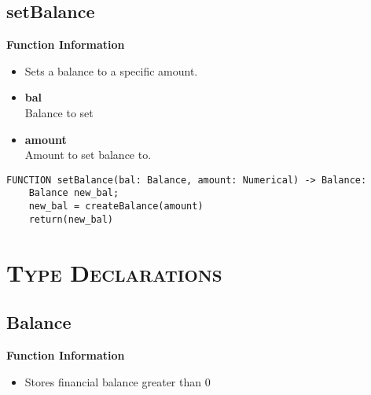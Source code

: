 \subsection{setBalance}
\textbf{Function Information}
\begin{itemize}
	\setlength{\itemsep}{5pt}
	\setlength{\parskip}{0pt}
	\setlength{\parsep}{0pt}
	\item Sets a balance to a specific amount.
	\item \textbf{bal} \\ Balance to set
	\item \textbf{amount} \\ Amount to set balance to.
\end{itemize}

\begin{verbatim}
FUNCTION setBalance(bal: Balance, amount: Numerical) -> Balance:
	Balance new_bal;
	new_bal = createBalance(amount)
	return(new_bal)
\end{verbatim}


\section{\textsc{Type Declarations}}

\subsection{Balance}
\textbf{Function Information}
\begin{itemize}
	\setlength{\itemsep}{5pt}
	\setlength{\parskip}{0pt}
	\setlength{\parsep}{0pt}
	\item Stores financial balance greater than 0
\end{itemize}

